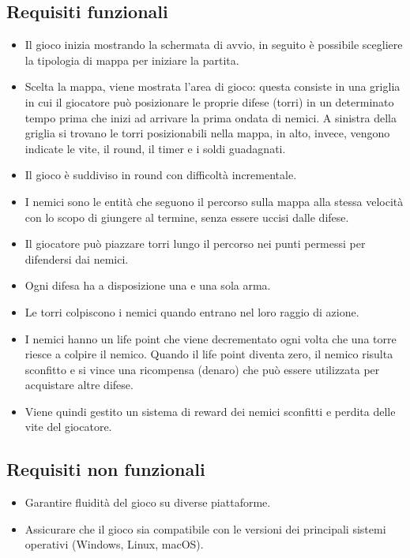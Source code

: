 \documentclass[a4paper,12pt]{report}
\begin{document}
\subsection*{Requisiti funzionali}
\begin{itemize}
	\item Il gioco inizia mostrando la schermata di avvio, in seguito è possibile scegliere la tipologia di mappa per iniziare la partita.
	\item Scelta la mappa, viene mostrata l’area di gioco: questa consiste in una griglia in cui il giocatore può posizionare le proprie difese (torri) in un determinato tempo prima che inizi ad arrivare la prima ondata di nemici. A sinistra della griglia si trovano le torri posizionabili nella mappa, in alto, invece, vengono indicate le vite, il round, il timer e i soldi guadagnati.
	\item Il gioco è suddiviso in round con difficoltà incrementale.
	\item I nemici sono le entità che seguono il percorso sulla mappa alla stessa velocità con lo scopo di giungere al termine, senza essere uccisi dalle difese.
	\item Il giocatore può piazzare torri lungo il percorso nei punti permessi per difendersi dai nemici.
	\item Ogni difesa ha a disposizione una e una sola arma.
	\item Le torri colpiscono i nemici quando entrano nel loro raggio di azione.
	\item I nemici hanno un life point che viene decrementato ogni volta che una torre riesce a colpire il nemico. Quando il life point diventa zero, il nemico risulta sconfitto e si vince una ricompensa (denaro) che può essere utilizzata per acquistare altre difese.
	\item Viene quindi gestito un sistema di reward dei nemici sconfitti e perdita delle vite del giocatore.
\end{itemize}

\subsection*{Requisiti non funzionali}
\begin{itemize}
	\item Garantire fluidità del gioco su diverse piattaforme.
	\item Assicurare che il gioco sia compatibile con le versioni dei principali sistemi operativi (Windows, Linux, macOS).
\end{itemize}
\newpage
\end{document}
